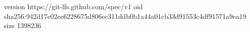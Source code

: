 version https://git-lfs.github.com/spec/v1
oid sha256:942d17e02ec6228675d806ec311ddb0b1a44a01cb33d91553c4df91571a9ea19
size 1398236
